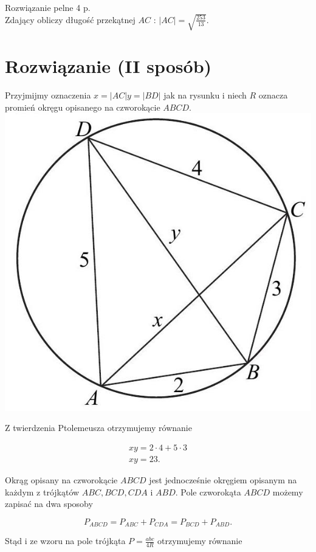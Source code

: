 \documentclass[10pt]{article}
\begin{document}
Rozwiązanie pelne 4 p.\\
Zdający obliczy długość przekątnej $A C$ : $|A C|=\sqrt{\frac{253}{13}}$.

\section*{Rozwiązanie (II sposób)}
Przyjmijmy oznaczenia $x=|A C| y=|B D|$ jak na rysunku i niech $R$ oznacza promień okręgu opisanego na czworokącie $A B C D$.\\
\includegraphics[max width=\textwidth, center]{2025_02_07_f5f4e8f37e6baab02e47g-13}

Z twierdzenia Ptolemeusza otrzymujemy równanie

$$
\begin{gathered}
x y=2 \cdot 4+5 \cdot 3 \\
x y=23 .
\end{gathered}
$$

Okrąg opisany na czworokącie $A B C D$ jest jednocześnie okręgiem opisanym na każdym z trójkątów $A B C, B C D, C D A$ i $A B D$. Pole czworokąta $A B C D$ możemy zapisać na dwa sposoby

$$
P_{A B C D}=P_{A B C}+P_{C D A}=P_{B C D}+P_{A B D} .
$$

Stąd i ze wzoru na pole trójkąta $P=\frac{a b c}{4 R}$ otrzymujemy równanie
\end{document}
